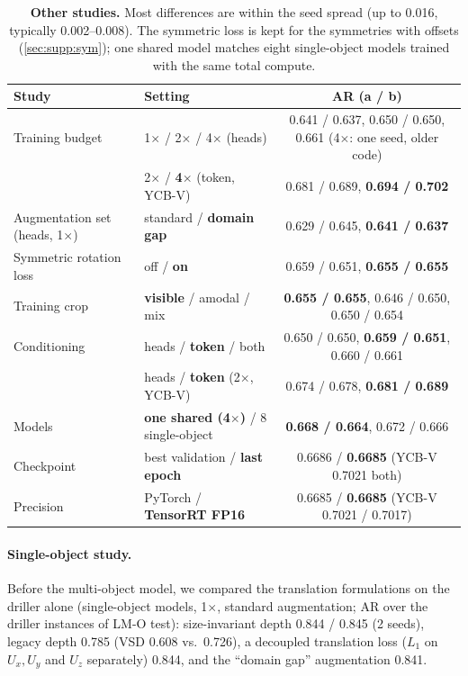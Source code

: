 \begin{table}[h]
  \centering
  \setlength{\tabcolsep}{3.5pt}
  \footnotesize
  \begin{tabular}{llc}
    \toprule
    Study & Setting & AR (a / b) \\
    \midrule
    Training budget & 1$\times$ / 2$\times$ / 4$\times$ (heads) & 0.641 / 0.637, 0.650 / 0.650, 0.661 (4$\times$: one seed, older code) \\
    & 2$\times$ / \textbf{4$\times$} (token, YCB-V) & 0.681 / 0.689, \textbf{0.694 / 0.702} \\
    Augmentation set (heads, 1$\times$) & standard / \textbf{domain gap} & 0.629 / 0.645, \textbf{0.641 / 0.637} \\
    Symmetric rotation loss & off / \textbf{on} & 0.659 / 0.651, \textbf{0.655 / 0.655} \\
    Training crop & \textbf{visible} / amodal / mix & \textbf{0.655 / 0.655}, 0.646 / 0.650, 0.650 / 0.654 \\
    Conditioning & heads / \textbf{token} / both & 0.650 / 0.650, \textbf{0.659 / 0.651}, 0.660 / 0.661 \\
    & heads / \textbf{token} (2$\times$, YCB-V) & 0.674 / 0.678, \textbf{0.681 / 0.689} \\
    Models & \textbf{one shared (4$\times$)} / 8 single-object & \textbf{0.668 / 0.664}, 0.672 / 0.666 \\
    Checkpoint & best validation / \textbf{last epoch} & 0.6686 / \textbf{0.6685} (YCB-V 0.7021 both) \\
    Precision & PyTorch / \textbf{TensorRT FP16} & 0.6685 / \textbf{0.6685} (YCB-V 0.7021 / 0.7017) \\
    \bottomrule
  \end{tabular}
  \caption{\textbf{Other studies.} Most differences are within the seed spread (up to 0.016,
  typically 0.002--0.008). The symmetric loss is kept for the symmetries with offsets
  (\cref{sec:supp:sym}); one shared model matches eight single-object models trained with the same
  total compute.}
  \label{tab:supp:other}
\end{table}

\paragraph{Single-object study.}
Before the multi-object model, we compared the translation formulations on the driller alone
(single-object models, 1$\times$, standard augmentation; AR over the driller instances of LM-O
test): size-invariant depth 0.844 / 0.845 (2 seeds), legacy depth 0.785 (VSD 0.608 vs.\ 0.726),
a decoupled translation loss ($L_1$ on $U_x, U_y$ and $U_z$ separately) 0.844, and the ``domain
gap'' augmentation 0.841.

